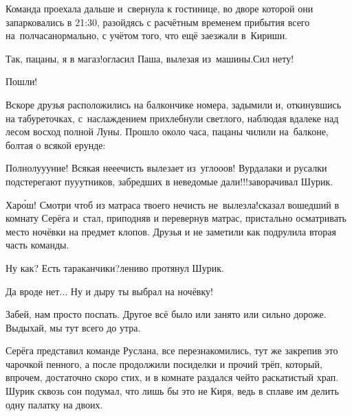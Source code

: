Команда проехала дальше и~свернула к гостинице, во дворе которой они запарковались в 21:30, разойдясь с расчётным временем прибытия всего на~полчаса\mdash нормально, с учётом того, что ещё заезжали в~Кириши.

\diagdash Так, пацаны, я в магаз!\mdash огласил Паша, вылезая из~машины.\mdash Сил нету!

\diagdash Пошли!

Вскоре друзья расположились на балкончике номера, задымили и, откинувшись на табуреточках, с~наслаждением прихлебнули светлого, наблюдая вдалеке над лесом восход полной Луны. Прошло около часа, пацаны чилили на~балконе, болтая о всякой ерунде:

\diagdash Полнолу\sdash у\sdash уние! Всякая не\sdash е\sdash ечисть вылезает из~угло\sdash о\sdash ов! Вурдалаки и русалки подстерегают пу\sdash у\sdash утников, забредших в неведомые дали!!!\mdash заворачивал Шурик.

\diagdash Хар\'{о}ш! Смотри чтоб из матраса твоего нечисть не~вылезла!\mdash сказал вошедший в комнату Серёга и~стал, приподняв и перевернув матрас, пристально осматривать место ночёвки на предмет клопов. Друзья и не заметили как подрулила вторая часть команды.

\diagdash Ну как? Есть тараканчики?\mdash лениво протянул Шурик.

\diagdash Да вроде нет$\ldots$ Ну и дыру ты выбрал на ночёвку! 

\diagdash Забей, нам просто поспать. Другое всё было или занято или сильно дороже. Выдыхай, мы тут всего до утра.

Серёга представил команде Руслана, все перезнакомились, тут же закрепив это чарочкой пенного, а после продолжили посиделки и прочий трёп, который, впрочем, достаточно скоро стих, и в комнате раздался чей\sdash то раскатистый храп. Шурик сквозь сон подумал, что лишь бы это не Киря, ведь в сплаве им делить одну палатку на двоих.

\vspace{-0.2cm}
\begin{center}
\end{center}